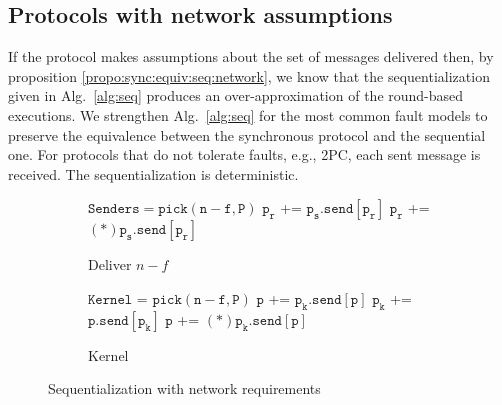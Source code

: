 \subsection{Protocols with network assumptions}

If the protocol makes assumptions about the set of messages delivered then, by proposition \ref{propo:sync:equiv:seq:network}, we know that the sequentialization given in Alg.~\ref{alg:seq} produces an over-approximation of the round-based executions. We strengthen Alg.~\ref{alg:seq} for the most common fault models to preserve the equivalence between the synchronous protocol and the sequential one. For protocols that do not tolerate faults, e.g., 2PC,  each sent message is received. The sequentialization is deterministic. 

\begin{figure}[h]
    \begin{subfigure}{.5\textwidth}
        \begin{algorithmic}[1]
        \scriptsize
         \label{seq:send}
        \State $\mathtt{Senders = pick(n-f, P)}$
                \State $\mathtt{p_r}$ += $\mathtt{p_s.send[p_r]}$
            \Else
                \State $\mathtt{p_r}$ += $\mathtt{(*)p_s.send[p_r]}$
            \EndIf
        \EndFor
        \EndFor
        \end{algorithmic}
        \caption{Deliver $n-f$}
        \label{alg:seq-ben-or}
    \end{subfigure}%
    \begin{subfigure}{.45\textwidth}
        \begin{algorithmic}[1]
        \scriptsize
        \State $\mathtt{Kernel}$ = $\mathtt{pick(n-f, P)}$
         \label{seq:send}
                    \State $\mathtt{p}$ += $\mathtt{p_k.send[p]}$
                    \State $\mathtt{p_k}$ += $\mathtt{p.send[p_k]}$
                \Else
                    \State $\mathtt{p}$ += $\mathtt{(*)p_k.send[p]}$
                \EndIf
            \EndFor
        \EndFor
        \end{algorithmic}
        \caption{Kernel}
        \label{alg:seq-kernel}
    \end{subfigure}
    \caption{Sequentialization with network requirements}
\end{figure}

